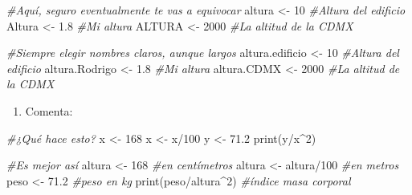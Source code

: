 \documentclass[]{tufte-book}
\newenvironment{Shaded}{}{}
\newcommand{\CommentTok}[1]{\textcolor[rgb]{0.38,0.63,0.69}{\textit{#1}}}
\newcommand{\DecValTok}[1]{\textcolor[rgb]{0.25,0.63,0.44}{#1}}
\newcommand{\FloatTok}[1]{\textcolor[rgb]{0.25,0.63,0.44}{#1}}
\newcommand{\FunctionTok}[1]{\textcolor[rgb]{0.02,0.16,0.49}{#1}}
\newcommand{\NormalTok}[1]{#1}
\newcommand{\OtherTok}[1]{\textcolor[rgb]{0.00,0.44,0.13}{#1}}
\newcommand{\SpecialCharTok}[1]{\textcolor[rgb]{0.25,0.44,0.63}{#1}}
\providecommand{\tightlist}{%
  \setlength{\itemsep}{0pt}\setlength{\parskip}{0pt}}
\begin{document}
\begin{Shaded}
\begin{Highlighting}[]
\CommentTok{\#Aquí, seguro eventualmente te vas a equivocar}
\NormalTok{altura }\OtherTok{\textless{}{-}} \DecValTok{10}   \CommentTok{\#Altura del edificio}
\NormalTok{Altura }\OtherTok{\textless{}{-}} \FloatTok{1.8}  \CommentTok{\#Mi altura}
\NormalTok{ALTURA }\OtherTok{\textless{}{-}} \DecValTok{2000} \CommentTok{\#La altitud de la CDMX}

\CommentTok{\#Siempre elegir nombres claros, aunque largos}
\NormalTok{altura.edificio }\OtherTok{\textless{}{-}} \DecValTok{10}   \CommentTok{\#Altura del edificio}
\NormalTok{altura.Rodrigo  }\OtherTok{\textless{}{-}} \FloatTok{1.8}  \CommentTok{\#Mi altura}
\NormalTok{altura.CDMX     }\OtherTok{\textless{}{-}} \DecValTok{2000} \CommentTok{\#La altitud de la CDMX}
\end{Highlighting}
\end{Shaded}

\begin{enumerate}
\def\labelenumi{\arabic{enumi}.}
\setcounter{enumi}{5}
\tightlist
\item
  Comenta:
\end{enumerate}

\begin{Shaded}
\begin{Highlighting}[]
\CommentTok{\#¿Qué hace esto?}
\NormalTok{x }\OtherTok{\textless{}{-}} \DecValTok{168}
\NormalTok{x }\OtherTok{\textless{}{-}}\NormalTok{ x}\SpecialCharTok{/}\DecValTok{100}
\NormalTok{y }\OtherTok{\textless{}{-}} \FloatTok{71.2}
\FunctionTok{print}\NormalTok{(y}\SpecialCharTok{/}\NormalTok{x}\SpecialCharTok{\^{}}\DecValTok{2}\NormalTok{) }
  
\CommentTok{\#Es mejor así}
\NormalTok{altura }\OtherTok{\textless{}{-}} \DecValTok{168}        \CommentTok{\#en centímetros}
\NormalTok{altura }\OtherTok{\textless{}{-}}\NormalTok{ altura}\SpecialCharTok{/}\DecValTok{100} \CommentTok{\#en metros}
\NormalTok{peso   }\OtherTok{\textless{}{-}} \FloatTok{71.2}       \CommentTok{\#peso en kg}
\FunctionTok{print}\NormalTok{(peso}\SpecialCharTok{/}\NormalTok{altura}\SpecialCharTok{\^{}}\DecValTok{2}\NormalTok{) }\CommentTok{\#índice masa corporal}
\end{Highlighting}
\end{Shaded}
\end{document}
